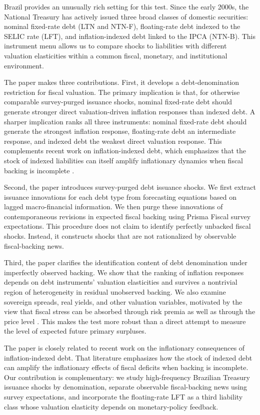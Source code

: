 \documentclass[12pt,a4paper]{article}
\begin{document}
Brazil provides an unusually rich setting for this test. Since the early 2000s, the National Treasury has actively issued three broad classes of domestic securities: nominal fixed-rate debt (LTN and NTN-F), floating-rate debt indexed to the SELIC rate (LFT), and inflation-indexed debt linked to the IPCA (NTN-B). This instrument menu allows us to compare shocks to liabilities with different valuation elasticities within a common fiscal, monetary, and institutional environment.

The paper makes three contributions. First, it develops a debt-denomination restriction for fiscal valuation. The primary implication is that, for otherwise comparable survey-purged issuance shocks, nominal fixed-rate debt should generate stronger direct valuation-driven inflation responses than indexed debt. A sharper implication ranks all three instruments: nominal fixed-rate debt should generate the strongest inflation response, floating-rate debt an intermediate response, and indexed debt the weakest direct valuation response. This complements recent work on inflation-indexed debt, which emphasizes that the stock of indexed liabilities can itself amplify inflationary dynamics when fiscal backing is incomplete \citep{Kawalec2025}.

Second, the paper introduces survey-purged debt issuance shocks. We first extract issuance innovations for each debt type from forecasting equations based on lagged macro-financial information. We then purge these innovations of contemporaneous revisions in expected fiscal backing using Prisma Fiscal survey expectations. This procedure does not claim to identify perfectly unbacked fiscal shocks. Instead, it constructs shocks that are not rationalized by observable fiscal-backing news.

Third, the paper clarifies the identification content of debt denomination under imperfectly observed backing. We show that the ranking of inflation responses depends on debt instruments' valuation elasticities and survives a nontrivial region of heterogeneity in residual unobserved backing. We also examine sovereign spreads, real yields, and other valuation variables, motivated by the view that fiscal stress can be absorbed through risk premia as well as through the price level \citep{Uribe2006}. This makes the test more robust than a direct attempt to measure the level of expected future primary surpluses.

The paper is closely related to recent work on the inflationary consequences of inflation-indexed debt. That literature emphasizes how the stock of indexed debt can amplify the inflationary effects of fiscal deficits when backing is incomplete. Our contribution is complementary: we study high-frequency Brazilian Treasury issuance shocks by denomination, separate observable fiscal-backing news using survey expectations, and incorporate the floating-rate LFT as a third liability class whose valuation elasticity depends on monetary-policy feedback.
\end{document}
